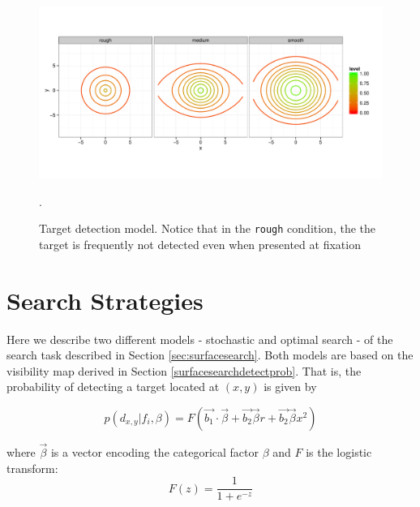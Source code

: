 \documentclass[preprint, authoryear]{elsarticle} %
\begin{document}

\begin{figure}
	\centering
	\includegraphics[width=12cm]{fig/targDetResults.pdf}
	\caption{Target detection model. Notice that in the \texttt{rough} condition, the the target is frequently not detected even when presented at fixation}. 
	\label{fig:targDet}
\end{figure}


\section{Search Strategies}

Here we describe two different models - stochastic and optimal search - of the search task described in Section \ref{sec:surfacesearch}. Both models are based on the visibility map derived in Section \ref{surfacesearchdetectprob}. That is, the probability of detecting a target located at $(x,y)$ is given by

\begin{equation}
 p(d_{x,y}|f_i,\beta) = F(\vec{b_1}\cdot\vec{\beta} + \vec{b_2}\vec{\beta} r + \vec{b_2}\vec{\beta}x^2)
 \label{eq:targDet}
\end{equation} 

where $\vec{\beta}$ is a vector encoding the categorical factor $\beta$ and $F$ is the logistic transform:
\begin{equation}
F(z)= \frac{1}{1+e^{-z}}
\end{equation}
\end{document}
